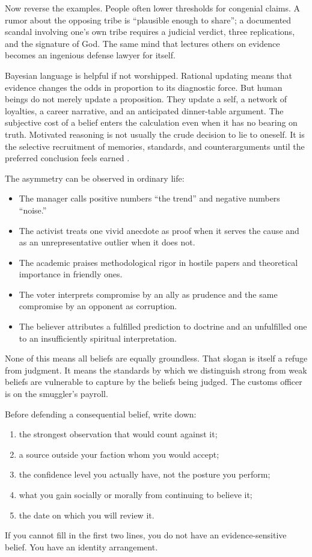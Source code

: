 ﻿\documentclass[12pt,a4paper]{book}
\begin{document}
Now reverse the examples. People often lower thresholds for congenial claims. A rumor about the opposing tribe is “plausible enough to share”; a documented scandal involving one's own tribe requires a judicial verdict, three replications, and the signature of God. The same mind that lectures others on evidence becomes an ingenious defense lawyer for itself.

Bayesian language is helpful if not worshipped. Rational updating means that evidence changes the odds in proportion to its diagnostic force. But human beings do not merely update a proposition. They update a self, a network of loyalties, a career narrative, and an anticipated dinner-table argument. The subjective cost of a belief enters the calculation even when it has no bearing on truth. Motivated reasoning is not usually the crude decision to lie to oneself. It is the selective recruitment of memories, standards, and counterarguments until the preferred conclusion feels earned \cite{Kunda1990}.

The asymmetry can be observed in ordinary life:

\begin{itemize}
  \item The manager calls positive numbers “the trend” and negative numbers “noise.”
  \item The activist treats one vivid anecdote as proof when it serves the cause and as an unrepresentative outlier when it does not.
  \item The academic praises methodological rigor in hostile papers and theoretical importance in friendly ones.
  \item The voter interprets compromise by an ally as prudence and the same compromise by an opponent as corruption.
  \item The believer attributes a fulfilled prediction to doctrine and an unfulfilled one to an insufficiently spiritual interpretation.
\end{itemize}

None of this means all beliefs are equally groundless. That slogan is itself a refuge from judgment. It means the standards by which we distinguish strong from weak beliefs are vulnerable to capture by the beliefs being judged. The customs officer is on the smuggler's payroll.

Before defending a consequential belief, write down:
\begin{enumerate}
  \item the strongest observation that would count against it;
  \item a source outside your faction whom you would accept;
  \item the confidence level you actually have, not the posture you perform;
  \item what you gain socially or morally from continuing to believe it;
  \item the date on which you will review it.
\end{enumerate}
If you cannot fill in the first two lines, you do not have an evidence-sensitive belief. You have an identity arrangement.
\end{document}
